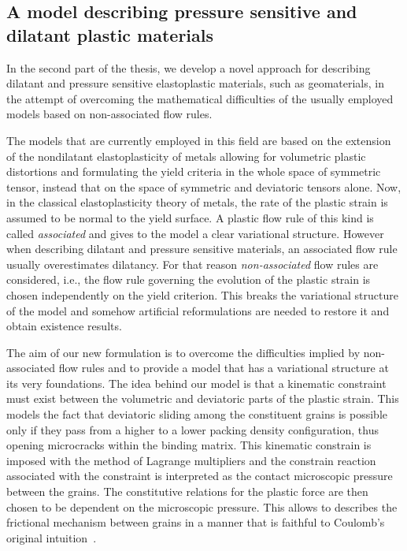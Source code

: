 \documentclass[a4paper,10pt,oneside]{amsbook}
\numberwithin{section}{chapter}
\numberwithin{equation}{chapter}
\theoremstyle{definition}
\begin{document}
\subsection*{A model describing pressure sensitive and dilatant plastic materials}

In the second part of the thesis, we develop a novel approach for describing dilatant and pressure sensitive elastoplastic materials, such as geomaterials, in the attempt of overcoming the mathematical difficulties of the usually employed models based on non-associated flow rules.

The models that are currently employed in this field are based on the extension of the nondilatant elastoplasticity of metals allowing for volumetric plastic distortions and formulating the yield criteria in the whole space of symmetric tensor, instead that on the space of symmetric and deviatoric tensors alone. Now, in the classical elastoplasticity theory of metals, the rate of the plastic strain is assumed to be normal to the yield surface. A plastic flow rule of this kind is called \emph{associated} and gives to the model a clear variational structure. However when describing dilatant and pressure sensitive materials, an associated flow rule usually overestimates dilatancy. For that reason \emph{non-associated} flow rules are considered, i.e., the flow rule governing the evolution of the plastic strain is chosen independently on the yield criterion. This breaks the variational structure of the model and somehow artificial reformulations are needed to restore it and obtain existence results.

The aim of our new formulation is to overcome the difficulties implied by non-associated flow rules and to provide a model that has a variational structure at its very foundations. The idea behind our model is that a kinematic constraint must exist between the volumetric and deviatoric parts of the plastic strain. This models the fact that deviatoric sliding among the constituent grains is possible only if they pass from a higher to a lower packing density configuration, thus opening microcracks within the binding matrix. This kinematic constrain is imposed with the method of Lagrange multipliers and the constrain reaction associated with the constraint is interpreted as the contact microscopic pressure between the grains. The constitutive relations for the plastic force are then chosen to be dependent on the microscopic pressure. This allows to describes the frictional mechanism between grains in a manner that is faithful to Coulomb's original intuition~\cite{Coulomb1776}.
\end{document}

